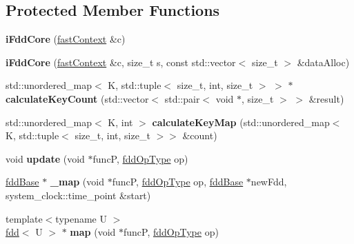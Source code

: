 \subsection*{Protected Member Functions}
\begin{DoxyCompactItemize}
\item 
\hypertarget{classfaster_1_1iFddCore_a5cdc2cf07bee57087e0997a0e140c9bd}{}\label{classfaster_1_1iFddCore_a5cdc2cf07bee57087e0997a0e140c9bd} 
{\bfseries i\+Fdd\+Core} (\hyperlink{classfaster_1_1fastContext}{fast\+Context} \&c)
\item 
\hypertarget{classfaster_1_1iFddCore_ab5be69b5752ab08168469e5baed451ef}{}\label{classfaster_1_1iFddCore_ab5be69b5752ab08168469e5baed451ef} 
{\bfseries i\+Fdd\+Core} (\hyperlink{classfaster_1_1fastContext}{fast\+Context} \&c, size\+\_\+t s, const std\+::vector$<$ size\+\_\+t $>$ \&data\+Alloc)
\item 
\hypertarget{classfaster_1_1iFddCore_a01a9a017ed4a89c3f7639452f242d364}{}\label{classfaster_1_1iFddCore_a01a9a017ed4a89c3f7639452f242d364} 
std\+::unordered\+\_\+map$<$ K, std\+::tuple$<$ size\+\_\+t, int, size\+\_\+t $>$ $>$ $\ast$ {\bfseries calculate\+Key\+Count} (std\+::vector$<$ std\+::pair$<$ void $\ast$, size\+\_\+t $>$ $>$ \&result)
\item 
\hypertarget{classfaster_1_1iFddCore_a9486ff6f13f33aa0d2e33d617eb75c99}{}\label{classfaster_1_1iFddCore_a9486ff6f13f33aa0d2e33d617eb75c99} 
std\+::unordered\+\_\+map$<$ K, int $>$ {\bfseries calculate\+Key\+Map} (std\+::unordered\+\_\+map$<$ K, std\+::tuple$<$ size\+\_\+t, int, size\+\_\+t $>$$>$ \&count)
\item 
\hypertarget{classfaster_1_1iFddCore_af5c3e4e57bf5931dbe861277e5035d42}{}\label{classfaster_1_1iFddCore_af5c3e4e57bf5931dbe861277e5035d42} 
void {\bfseries update} (void $\ast$funcP, \hyperlink{namespacefaster_a64379512d12d41c6e58f176939abfd80}{fdd\+Op\+Type} op)
\item 
\hypertarget{classfaster_1_1iFddCore_a483deae8e4c275dcbff0244ef33c2f4a}{}\label{classfaster_1_1iFddCore_a483deae8e4c275dcbff0244ef33c2f4a} 
\hyperlink{classfaster_1_1fddBase}{fdd\+Base} $\ast$ {\bfseries \+\_\+map} (void $\ast$funcP, \hyperlink{namespacefaster_a64379512d12d41c6e58f176939abfd80}{fdd\+Op\+Type} op, \hyperlink{classfaster_1_1fddBase}{fdd\+Base} $\ast$new\+Fdd, system\+\_\+clock\+::time\+\_\+point \&start)
\item 
\hypertarget{classfaster_1_1iFddCore_ad09cdfbaed755fb7c54b80d3bb6a4f63}{}\label{classfaster_1_1iFddCore_ad09cdfbaed755fb7c54b80d3bb6a4f63} 
{\footnotesize template$<$typename U $>$ }\\\hyperlink{classfaster_1_1fdd}{fdd}$<$ U $>$ $\ast$ {\bfseries map} (void $\ast$funcP, \hyperlink{namespacefaster_a64379512d12d41c6e58f176939abfd80}{fdd\+Op\+Type} op)
$$
\end{DoxyCompactItemize}
